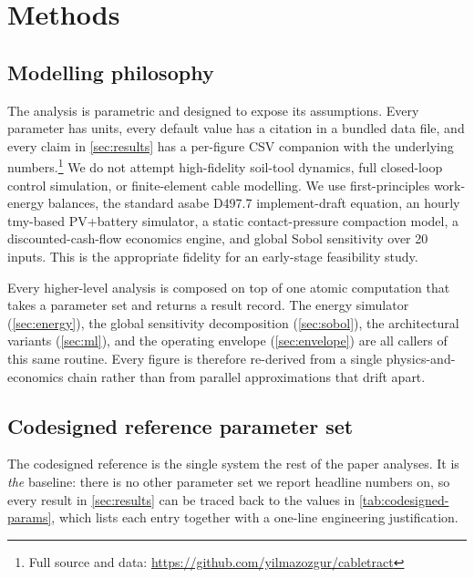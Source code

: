 \documentclass[11pt,a4paper]{article}
\newcommand{\cabletractrepo}{\url{https://github.com/yilmazozgur/cabletract}}
\begin{document}
\section{Methods}\label{sec:methods}

\subsection{Modelling philosophy}\label{sec:philosophy}

The analysis is parametric and designed to expose its assumptions. Every parameter has units, every default value has a citation in a bundled data file, and every claim in \cref{sec:results} has a per-figure CSV companion with the underlying numbers.\footnote{Full source and data: \cabletractrepo} We do not attempt high-fidelity soil-tool dynamics, full closed-loop control simulation, or finite-element cable modelling. We use first-principles work-energy balances, the standard \gls{asabe} D497.7 implement-draft equation, an hourly \gls{tmy}-based PV+battery simulator, a static contact-pressure compaction model, a discounted-cash-flow economics engine, and global Sobol sensitivity over 20 inputs. This is the appropriate fidelity for an early-stage feasibility study.

Every higher-level analysis is composed on top of one atomic computation that takes a parameter set and returns a result record. The energy simulator (\cref{sec:energy}), the global sensitivity decomposition (\cref{sec:sobol}), the architectural variants (\cref{sec:ml}), and the operating envelope (\cref{sec:envelope}) are all callers of this same routine. Every figure is therefore re-derived from a single physics-and-economics chain rather than from parallel approximations that drift apart.

\subsection{Codesigned reference parameter set}\label{sec:codesigned-ref}

The codesigned reference is the single system the rest of the paper analyses. It is \emph{the} baseline: there is no other parameter set we report headline numbers on, so every result in \cref{sec:results} can be traced back to the values in \cref{tab:codesigned-params}, which lists each entry together with a one-line engineering justification.
\end{document}

